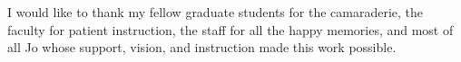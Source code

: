 \documentclass[12pt]{report}
\begin{document}
\beforepreface

I would like to thank my fellow graduate students for the camaraderie, the faculty for patient instruction, the staff for all the happy memories, and most of all Jo whose support, vision, and instruction made this work possible. 


\afterpreface



%












%
%
\end{document}
